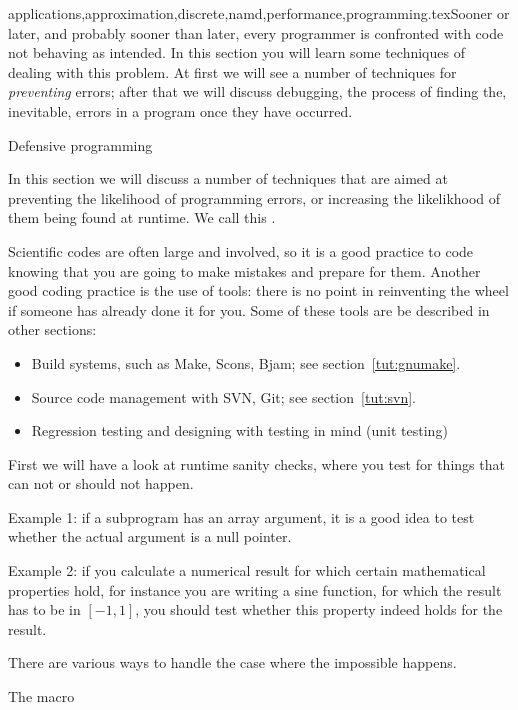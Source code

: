 {applications,approximation,discrete,namd,performance,programming}.texSooner or later, and probably sooner than later, every programmer is
confronted with code not behaving as intended. In this section you
will learn some techniques of dealing with this problem. At first we
will see a number of techniques for \emph{preventing} errors; after
that we will discuss debugging, the process of
finding the, inevitable, errors in a program once they have occurred.

 {Defensive programming}

In this section we will discuss a number of  techniques
that are aimed at preventing the likelihood of programming errors, or
increasing the likelikhood of them being found at runtime.
We call this  . 

Scientific codes are often large and involved, so it
is a good practice to code knowing that you are going to make mistakes
and prepare for them. Another good coding practice is the use of
tools: there is no point in reinventing the wheel if someone has
already done it for you. Some of these tools are be described in
other sections:
\begin{itemize}
\item Build systems, such as Make, Scons, Bjam; see section~\ref{tut:gnumake}.
\item Source code management with SVN, Git; see section~\ref{tut:svn}.
\item Regression testing and designing with testing in mind (unit testing)
\end{itemize}

First we will have a look at runtime sanity checks, where you test 
for things that can not or should not
happen. 

Example 1: if a subprogram has an array argument, it is a good idea to
test whether the actual argument is a null pointer.

Example 2: if you calculate a numerical result for which certain
mathematical properties hold, for instance you are writing a sine function, for
which the result has to be in $[-1,1]$, you should test whether this
property indeed holds for the result.

There are various ways to handle the case where the impossible
happens.

 {The \protect{} macro}

